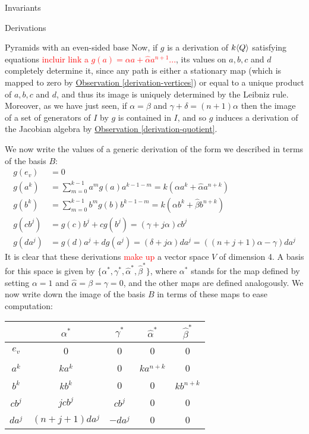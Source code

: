 \begin{chapter}{Invariants}
\begin{section}{Derivations}
\begin{subsection}{Pyramids with an even-sided base}
Now, if $g$ is a derivation of $k\langle Q\rangle$ satisfying equations \textcolor{red}{incluir link a $g(a)=\alpha a + \hat\alpha a^{n+1}...$}, its values on $a,b,c$ and $d$ completely determine it, since any path is either a stationary map (which is mapped to zero by \hyperref[derivation-vertices]{Observation \ref*{derivation-vertices}}) or equal to a unique product of $a,b,c$ and $d$, and thus its image is uniquely determined by the Leibniz rule. Moreover, as we have just seen, if $\alpha=\beta$ and $\gamma+\delta=(n+1)\alpha$ then the image of a set of generators of $I$ by $g$ is contained in $I$, and so $g$ induces a derivation of the Jacobian algebra  by \hyperref[derivation-quotient]{Observation \ref*{derivation-quotient}}.

We now write the values of a generic derivation of the form we described in terms of the basis $B$:
\begin{align*}
g(e_v) &= 0\\
g(a^k) &=\sum_{m=0}^{k-1} a^mg(a)a^{k-1-m}=k(\alpha a^k + \hat\alpha a^{n+k}) \\
g(b^k) &=\sum_{m=0}^{k-1}b^mg(b)b^{k-1-m}=k(\alpha b^k + \hat\beta b^{n+k})\\
g(cb^j) &= g(c)b^j + cg(b^j) = (\gamma+j\alpha) cb^j \\
g(da^j) &= g(d)a^j + dg(a^j) = (\delta+j\alpha) da^j = \left((n+j+1)\alpha-\gamma\right)da^j
\end{align*}
It is clear that these derivations \textcolor{red}{make up} a vector space $V$ of dimension 4. A basis for this space is given by $\{\alpha^*, \gamma^*, \hat\alpha^*, \hat\beta^*\}$, where $\alpha^*$ stands for the map defined by setting $\alpha=1$ and $\hat\alpha=\beta=\gamma=0$, and the other maps are defined analogously. We now write down the image of the basis $B$ in terms of these maps to ease computation:
\begin{center}
\begin{tabular}{ c | c | c | c | c }
	& 	$\alpha^*$ 		& $\gamma^*$	& $\hat\alpha^*$	& $\hat\beta^*$	\\
\hline
$e_v$ & 	0 			& 0 			& 0			& 0 \\
$a^k$ & 	$ka^k$ 		& 0			& $ka^{n+k}$	& 0 \\
$b^k$ & 	$kb^k$ 		& 0			& 0			& $kb^{n+k}$ \\
$cb^j$ & 	$jcb^j$ 		& $cb^j$		& 0			& 0 \\
$da^j$ & 	$(n+j+1)da^j$	& $-da^j$		& 0			& 0 
\end{tabular}
\end{center}


\end{subsection}
\end{section}
\end{chapter}
